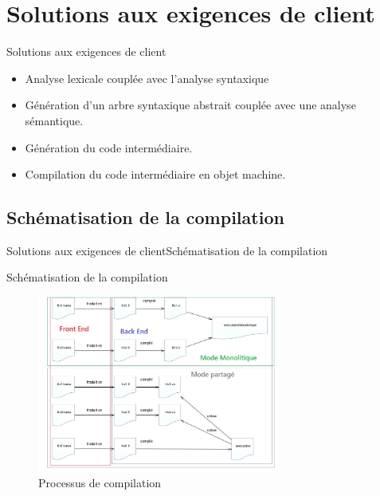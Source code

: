 \section{Solutions aux exigences de client}
     \begin{frame}{Solutions aux exigences de client}{}
        \begin{itemize}
          \item<1-> Analyse lexicale couplée avec l'analyse syntaxique
          \item<2-> Génération d’un arbre syntaxique abstrait couplée avec une analyse sémantique.
          \item<3-> Génération du code intermédiaire.
          \item<4-> Compilation du code intermédiaire en objet machine.
        \end{itemize}
     \end{frame}
   \subsection{Schématisation de la compilation}
      \begin{frame}{Solutions aux exigences de client}{Schématisation de la compilation}
        \begin{block}{Schématisation de la compilation}
          \begin{figure}[!h]
            \includegraphics[width=8cm]{../res/presentation/fig2.png}
            \caption{Processus de compilation}
            \label{processus_de_compilation}
          \end{figure}
        \end{block}
      \end{frame}
